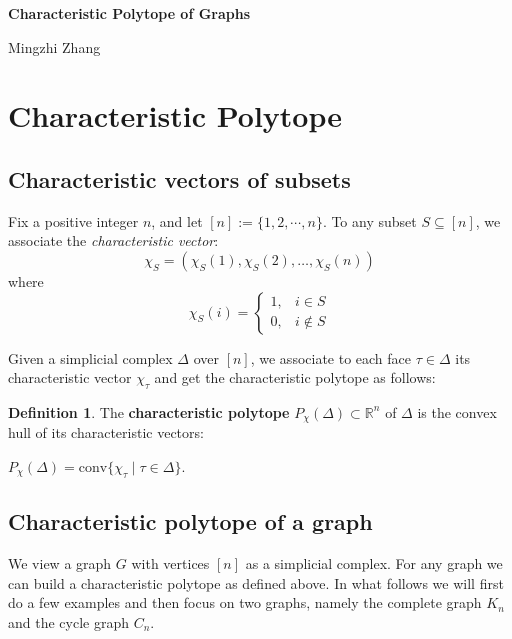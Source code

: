 \documentclass[12pt]{article}
\theoremstyle{definition}
\newtheorem{defi}[thm]{Definition}
\numberwithin{equation}{subsection}
\begin{document}
\begin{center}
{\Large\bf 
Characteristic Polytope of Graphs
}\\ [7pt]
\end{center}

\vskip 3mm

\begin{center}
Mingzhi Zhang
\end{center}

\vskip 3mm

\section{Characteristic Polytope}

\subsection{Characteristic vectors of subsets}
Fix a positive integer $n$, and let $[n]:= \{1, 2, \cdots , n\}$. To any subset $S \subseteq [n]$, we associate the \textit{characteristic vector}:
\[
\chi_{S} = (\chi_{S}(1), \chi_{S}(2), \ldots, \chi_{S}(n))
\]
where 
\[
\chi_{S}(i) = 
\begin{cases} 
1, & i \in S \\
0, & i \notin S
\end{cases}
\]

Given a simplicial complex $\Delta$ over $[n]$, we associate to each face $\tau \in \Delta$ its characteristic vector $\chi_{\tau}$ and get the characteristic polytope as follows:

\begin{defi}
    The \textbf{characteristic polytope} $P_{\chi}(\Delta) \subset \mathbb{R}^{n}$ of $\Delta$ is the convex hull of its characteristic vectors:
\begin{center}
    $P_{\chi}(\Delta) = \text{conv} \{\chi_{\tau} \mid \tau \in \Delta\}$.
\end{center}
\end{defi}

\subsection{Characteristic polytope of a graph}
We view a graph $G$ with vertices $[n]$ as a simplicial complex. For any graph we can build a characteristic polytope as defined above. In what follows we will first do a few examples and then focus on two graphs, namely the complete graph $K_n$ and the cycle graph $C_n$. 
\end{document}
